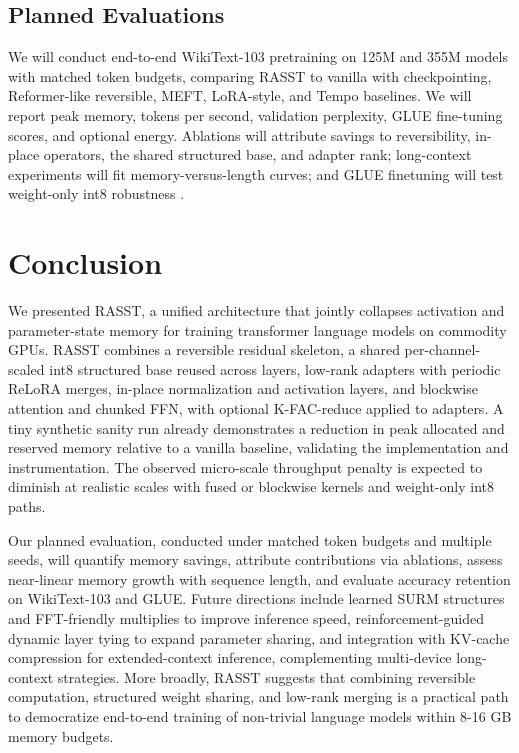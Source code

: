 \documentclass{article}
\begin{document}
\subsection{Planned Evaluations}
We will conduct end-to-end WikiText-103 pretraining on 125M and 355M models with matched token budgets, comparing RASST to vanilla with checkpointing, Reformer-like reversible, MEFT, LoRA-style, and Tempo baselines. We will report peak memory, tokens per second, validation perplexity, GLUE fine-tuning scores, and optional energy. Ablations will attribute savings to reversibility, in-place operators, the shared structured base, and adapter rank; long-context experiments will fit memory-versus-length curves; and GLUE finetuning will test weight-only int8 robustness \cite{liu-2023-blockwise}.

\section{Conclusion}
We presented RASST, a unified architecture that jointly collapses activation and parameter-state memory for training transformer language models on commodity GPUs. RASST combines a reversible residual skeleton, a shared per-channel-scaled int8 structured base reused across layers, low-rank adapters with periodic ReLoRA merges, in-place normalization and activation layers, and blockwise attention and chunked FFN, with optional K-FAC-reduce applied to adapters. A tiny synthetic sanity run already demonstrates a reduction in peak allocated and reserved memory relative to a vanilla baseline, validating the implementation and instrumentation. The observed micro-scale throughput penalty is expected to diminish at realistic scales with fused or blockwise kernels and weight-only int8 paths.

Our planned evaluation, conducted under matched token budgets and multiple seeds, will quantify memory savings, attribute contributions via ablations, assess near-linear memory growth with sequence length, and evaluate accuracy retention on WikiText-103 and GLUE. Future directions include learned SURM structures and FFT-friendly multiplies to improve inference speed, reinforcement-guided dynamic layer tying to expand parameter sharing, and integration with KV-cache compression for extended-context inference, complementing multi-device long-context strategies. More broadly, RASST suggests that combining reversible computation, structured weight sharing, and low-rank merging is a practical path to democratize end-to-end training of non-trivial language models within 8-16 GB memory budgets.




\end{document}
